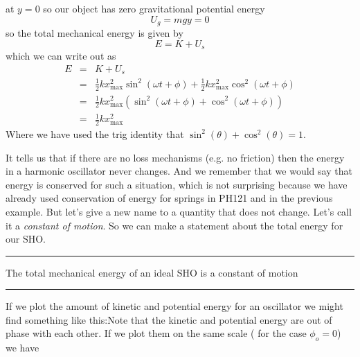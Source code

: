 \documentclass{book}
\begin{document}
at $y=0$ so our object has zero gravitational potential energy%
\begin{equation*}
U_{g}=mgy=0
\end{equation*}%
so the total mechanical energy is given by%
\begin{equation*}
E=K+U_{s}
\end{equation*}%
which we can write out as%
\begin{eqnarray*}
E &=&K+U_{s} \\
&=&\frac{1}{2}kx_{\max }^{2}\sin ^{2}\left( \omega t+\phi \right) +\frac{1}{2%
}kx_{\max }^{2}\cos ^{2}\left( \omega t+\phi \right) \\
&=&\frac{1}{2}kx_{\max }^{2}\left( \sin ^{2}\left( \omega t+\phi \right)
+\cos ^{2}\left( \omega t+\phi \right) \right) \\
&=&\frac{1}{2}kx_{\max }^{2}
\end{eqnarray*}%
Where we have used the trig identity that $\sin ^{2}\left( \theta \right)
+\cos ^{2}\left( \theta \right) =1.$

It tells us that if there are no loss mechanisms (e.g. no friction) then the
energy in a harmonic oscillator never changes. And we remember that we would
say that energy is conserved for such a situation, which is not surprising
because we have already used conservation of energy for springs in PH121 and
in the previous example. But let's give a new name to a quantity that does
not change. Let's call it a \emph{constant of motion}. So we can make a
statement about the total energy for our SHO.

\begin{center}
{\small \rule{300pt}{1pt}}

{\small The total mechanical energy of an ideal SHO is a constant of motion}

{\small \rule{300pt}{1pt}}
\end{center}

If we plot the amount of kinetic and potential energy for an oscillator we
might find something like this:Note that the kinetic and
potential energy are out of phase with each other. If we plot them on the
same scale ( for the case $\phi _{o}=0$) we have
\end{document}
